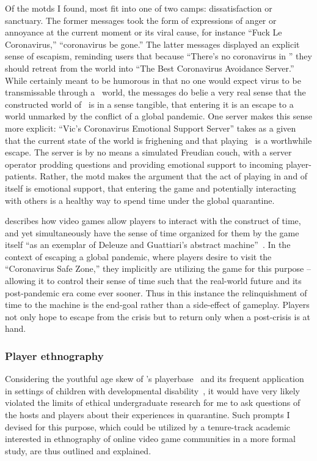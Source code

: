 \documentclass[2020/08/28 v2]{../../../coursework}
\newcommand{\mc}{\citetitle{Minecraft}}
\begin{document}
Of the \ac{motd}s I found, most fit into one of two camps: dissatisfaction or sanctuary.
The former messages took the form of expressions of anger or annoyance at the current
moment or its viral cause, for instance \enquote{Fuck Le Coronavirus,}
\enquote{coronavirus be gone.} The latter messages displayed an explicit sense of
escapism, reminding users that because \enquote{There's no coronavirus in \mc} they
should retreat from the world into \enquote{The Best Coronavirus Avoidance Server.}
While certainly meant to be humorous in that no one would expect \ac{virus} to be
transmissable through a \mc\ world, the messages do belie a very real sense that
the constructed world of \mc\ is in a sense tangible, that entering it is an escape
to a world unmarked by the conflict of a global pandemic.
One server makes this sense more explicit: \enquote{Vic's Coronavirus Emotional
Support Server} takes as a given that the current state of the world is frighening
and that playing \mc\ is a worthwhile escape. The server is by no means a simulated
Freudian couch, with a server operator prodding questions and providing emotional
support to incoming player-patients. Rather, the \ac{motd} makes the argument that
the act of playing in and of itself is emotional support, that entering the game and
potentially interacting with others is a healthy way to spend time under the global
quarantine.

\textcite{Barker2019} describes how video games allow players to interact with the
construct of time, and yet simultaneously have the sense of time organized for them
by the game itself \enquote{as an exemplar of Deleuze and Guattiari's abstract
machine}~\parencite[90]{Barker2019}. In the context of escaping a global pandemic, where players
desire to visit the \enquote{Coronavirus Safe Zone,} they implicitly are utilizing
the game for this purpose -- allowing it to control their sense of time such that
the real-world future and its post-pandemic era come ever sooner.
Thus in this instance the relinquishment of time to the machine is the end-goal rather
than a side-effect of gameplay. Players not only hope to escape from the crisis
but to return only when a post-crisis is at hand.

\subsubsection{Player ethnography}

Considering the youthful age skew of \mc's playerbase~\parencite{Mavoa2018,Kopecky2014}
and its frequent application in
settings of children with developmental disability~\parencite{Ringland2016}, it
would have very likely violated the limits of ethical undergraduate research for me
to ask questions of the hosts and players about their experiences in quarantine.
Such prompts I devised for this purpose, which could be utilized by a
tenure-track academic interested in ethnography of online video game communities
in a more formal study, are thus outlined and explained.
\end{document}

